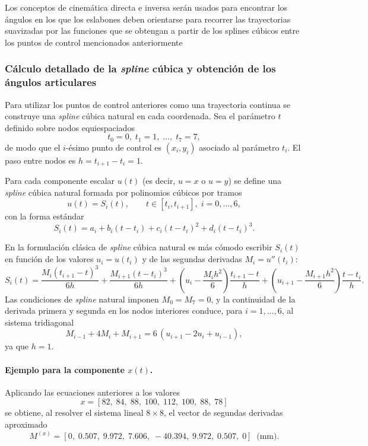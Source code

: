 \documentclass[11pt,a4paper]{article}
\begin{document}
Los conceptos de cinemática directa e inversa serán usados para encontrar los ángulos en los que los eslabones deben orientarse para recorrer las trayectorias suavizadas por las funciones que se obtengan a partir de los splines cúbicos entre los puntos de control mencionados anteriormente

\subsubsection{Cálculo detallado de la \emph{spline} cúbica y obtención de los ángulos articulares}

Para utilizar los puntos de control anteriores como una trayectoria continua se construye una \emph{spline} cúbica natural en cada coordenada.  
Sea el parámetro $t$ definido sobre nodos equiespaciados
\[
t_0 = 0,\; t_1 = 1,\; \dots,\; t_7 = 7,
\]
de modo que el $i$-ésimo punto de control es $(x_i,y_i)$ asociado al parámetro $t_i$.  
El paso entre nodos es $h = t_{i+1}-t_i = 1$.

Para cada componente escalar $u(t)$ (es decir, $u=x$ o $u=y$) se define una \emph{spline} cúbica natural formada por polinomios cúbicos por tramos
\[
u(t) = S_i(t), \qquad t\in[t_i,t_{i+1}],\; i=0,\dots,6,
\]
con la forma estándar
\[
S_i(t) = a_i + b_i (t-t_i) + c_i (t-t_i)^2 + d_i (t-t_i)^3 .
\]

En la formulación clásica de \emph{spline} cúbica natural es más cómodo escribir $S_i(t)$ en función de los valores $u_i=u(t_i)$ y de las segundas derivadas $M_i = u''(t_i)$:
\[
S_i(t) =
\frac{M_i (t_{i+1}-t)^3}{6h}
+\frac{M_{i+1} (t-t_i)^3}{6h}
+\left(u_i-\frac{M_i h^2}{6}\right)\frac{t_{i+1}-t}{h}
+\left(u_{i+1}-\frac{M_{i+1}h^2}{6}\right)\frac{t-t_i}{h}.
\]
Las condiciones de \emph{spline} natural imponen $M_0 = M_7 = 0$, y la continuidad de la derivada primera y segunda en los nodos interiores conduce, para $i=1,\dots,6$, al sistema tridiagonal
\[
M_{i-1} + 4 M_i + M_{i+1}
= 6\,(u_{i+1}-2u_i+u_{i-1}),
\]
ya que $h=1$.

\paragraph{Ejemplo para la componente $x(t)$.}
Aplicando las ecuaciones anteriores a los valores
\[
x = [82,\;84,\;88,\;100,\;112,\;100,\;88,\;78]
\]
se obtiene, al resolver el sistema lineal $8\times 8$, el vector de segundas derivadas aproximado
\[
M^{(x)} = 
[0,\;0.507,\;9.972,\;7.606,\;-40.394,\;9.972,\;0.507,\;0] \;\;\text{(mm)}.
\]
\end{document}
